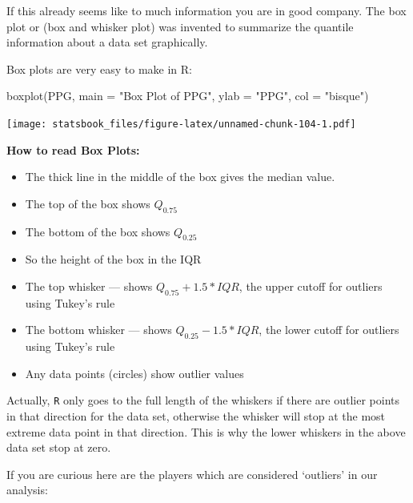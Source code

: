 \documentclass[
]{book}
\newenvironment{Shaded}{\begin{snugshade}}{\end{snugshade}}
\newcommand{\AttributeTok}[1]{\textcolor[rgb]{0.77,0.63,0.00}{#1}}
\newcommand{\FloatTok}[1]{\textcolor[rgb]{0.00,0.00,0.81}{#1}}
\newcommand{\FunctionTok}[1]{\textcolor[rgb]{0.00,0.00,0.00}{#1}}
\newcommand{\NormalTok}[1]{#1}
\newcommand{\OtherTok}[1]{\textcolor[rgb]{0.56,0.35,0.01}{#1}}
\newcommand{\SpecialCharTok}[1]{\textcolor[rgb]{0.00,0.00,0.00}{#1}}
\newcommand{\StringTok}[1]{\textcolor[rgb]{0.31,0.60,0.02}{#1}}
\providecommand{\tightlist}{%
  \setlength{\itemsep}{0pt}\setlength{\parskip}{0pt}}
\theoremstyle{definition}
\theoremstyle{definition}
\theoremstyle{definition}
\theoremstyle{definition}
\theoremstyle{remark}
\begin{document}
If this already seems like to much information you are in good company. The box plot or (box and whisker plot) was invented to summarize the quantile information about a data set graphically.

Box plots are very easy to make in R:

\begin{Shaded}
\begin{Highlighting}[]
\FunctionTok{boxplot}\NormalTok{(PPG, }\AttributeTok{main =} \StringTok{"Box Plot of PPG"}\NormalTok{, }\AttributeTok{ylab =} \StringTok{"PPG"}\NormalTok{, }\AttributeTok{col =} \StringTok{"bisque"}\NormalTok{)}
\end{Highlighting}
\end{Shaded}

\texttt{[image: statsbook\_files/figure-latex/unnamed-chunk-104-1.pdf]}

\textbf{How to read Box Plots:}

\begin{itemize}
\tightlist
\item
  The thick line in the middle of the box gives the median value.
\item
  The top of the box shows \(Q_{0.75}\)
\item
  The bottom of the box shows \(Q_{0.25}\)
\item
  So the height of the box in the IQR
\item
  The top whisker ---\textbar{} shows \(Q_{0.75}+1.5*IQR\), the upper cutoff for outliers using Tukey's rule
\item
  The bottom whisker ---\textbar{} shows \(Q_{0.25}-1.5*IQR\), the lower cutoff for outliers using Tukey's rule
\item
  Any data points (circles) show outlier values
\end{itemize}

Actually, \texttt{R} only goes to the full length of the whiskers if there are outlier points in that direction for the data set, otherwise the whisker will stop at the most extreme data point in that direction. This is why the lower whiskers in the above data set stop at zero.

If you are curious here are the players which are considered `outliers' in our analysis:

\begin{Shaded}
\end{Shaded}
\end{document}
